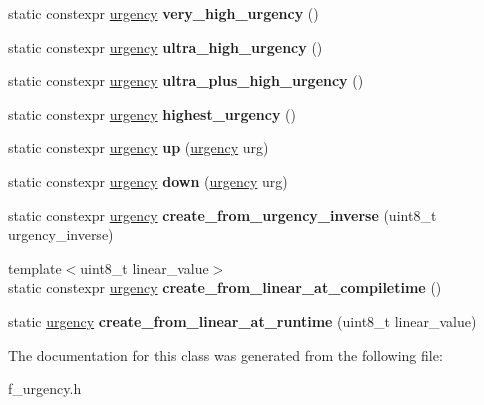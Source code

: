 \begin{DoxyCompactItemize}
\item 
\mbox{\label{classfsl_1_1os_1_1urgency_aac9a119ab879f6b945bf13d3c7ed2796}} 
static constexpr \mbox{\hyperlink{classfsl_1_1os_1_1urgency}{urgency}} {\bfseries very\+\_\+high\+\_\+urgency} ()
\item 
\mbox{\label{classfsl_1_1os_1_1urgency_a8b6716a2707f3a98877376bf103c14e1}} 
static constexpr \mbox{\hyperlink{classfsl_1_1os_1_1urgency}{urgency}} {\bfseries ultra\+\_\+high\+\_\+urgency} ()
\item 
\mbox{\label{classfsl_1_1os_1_1urgency_aca93104aded6b451ddfa554568e12df2}} 
static constexpr \mbox{\hyperlink{classfsl_1_1os_1_1urgency}{urgency}} {\bfseries ultra\+\_\+plus\+\_\+high\+\_\+urgency} ()
\item 
\mbox{\label{classfsl_1_1os_1_1urgency_a5b2768262642632633aafa1873196aec}} 
static constexpr \mbox{\hyperlink{classfsl_1_1os_1_1urgency}{urgency}} {\bfseries highest\+\_\+urgency} ()
\item 
\mbox{\label{classfsl_1_1os_1_1urgency_a9253a2f7bb8015de96ca44992d8b3c5e}} 
static constexpr \mbox{\hyperlink{classfsl_1_1os_1_1urgency}{urgency}} {\bfseries up} (\mbox{\hyperlink{classfsl_1_1os_1_1urgency}{urgency}} urg)
\item 
\mbox{\label{classfsl_1_1os_1_1urgency_a035dd199c55c5f94a14030352043d2fc}} 
static constexpr \mbox{\hyperlink{classfsl_1_1os_1_1urgency}{urgency}} {\bfseries down} (\mbox{\hyperlink{classfsl_1_1os_1_1urgency}{urgency}} urg)
\item 
\mbox{\label{classfsl_1_1os_1_1urgency_aa6b4a5e3b1a37302da2c3efcbd3c197e}} 
static constexpr \mbox{\hyperlink{classfsl_1_1os_1_1urgency}{urgency}} {\bfseries create\+\_\+from\+\_\+urgency\+\_\+inverse} (uint8\+\_\+t urgency\+\_\+inverse)
\item 
\mbox{\label{classfsl_1_1os_1_1urgency_ac07165bb57f22b23ad0cdb17dfb479f7}} 
{\footnotesize template$<$uint8\+\_\+t linear\+\_\+value$>$ }\\static constexpr \mbox{\hyperlink{classfsl_1_1os_1_1urgency}{urgency}} {\bfseries create\+\_\+from\+\_\+linear\+\_\+at\+\_\+compiletime} ()
\item 
\mbox{\label{classfsl_1_1os_1_1urgency_af6cf610aa81e058cb6b8e4e65cfff33a}} 
static \mbox{\hyperlink{classfsl_1_1os_1_1urgency}{urgency}} {\bfseries create\+\_\+from\+\_\+linear\+\_\+at\+\_\+runtime} (uint8\+\_\+t linear\+\_\+value)
\end{DoxyCompactItemize}


The documentation for this class was generated from the following file\+:\begin{DoxyCompactItemize}
\item 
f\+\_\+urgency.\+h\end{DoxyCompactItemize}
